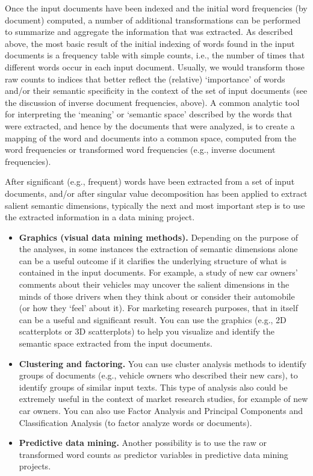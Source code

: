 Once the input documents have been indexed and the initial word frequencies (by document) computed, a number of additional transformations can be performed to summarize and aggregate the information that was extracted.
As described above, the most basic result of the initial indexing of words found in the input documents is a frequency table with simple counts, i.e., the number of times that different words occur in each input document. Usually, we would transform those raw counts to indices that better reflect the (relative) \enquote*{importance} of words and/or their semantic specificity in the context of the set of input documents (see the discussion of inverse document frequencies, above).
A common analytic tool for interpreting the \enquote*{meaning} or \enquote*{semantic space} described by the words that were extracted, and hence by the documents that were analyzed, is to create a mapping of the word and documents into a common space, computed from the word frequencies or transformed word frequencies (e.g., inverse document frequencies).

After significant (e.g., frequent) words have been extracted from a set of input documents, and/or after singular value decomposition has been applied to extract salient semantic dimensions, typically the next and most important step is to use the extracted information in a data mining project.
\begin{itemize}
	\item \textbf{Graphics (visual data mining methods).} Depending on the purpose of the analyses, in some instances the extraction of semantic dimensions alone can be a useful outcome if it clarifies the underlying structure of what is contained in the input documents. For example, a study of new car owners' comments about their vehicles may uncover the salient dimensions in the minds of those drivers when they think about or consider their automobile (or how they \enquote*{feel} about it). For marketing research purposes, that in itself can be a useful and significant result. You can use the graphics (e.g., 2D scatterplots or 3D scatterplots) to help you visualize and identify the semantic space extracted from the input documents.
	\item \textbf{Clustering and factoring.} You can use cluster analysis methods to identify groups of documents (e.g., vehicle owners who described their new cars), to identify groups of similar input texts. This type of analysis also could be extremely useful in the context of market research studies, for example of new car owners. You can also use Factor Analysis and Principal Components and Classification Analysis (to factor analyze words or documents).
	\item \textbf{Predictive data mining.} Another possibility is to use the raw or transformed word counts as predictor variables in predictive data mining projects.
\end{itemize}



